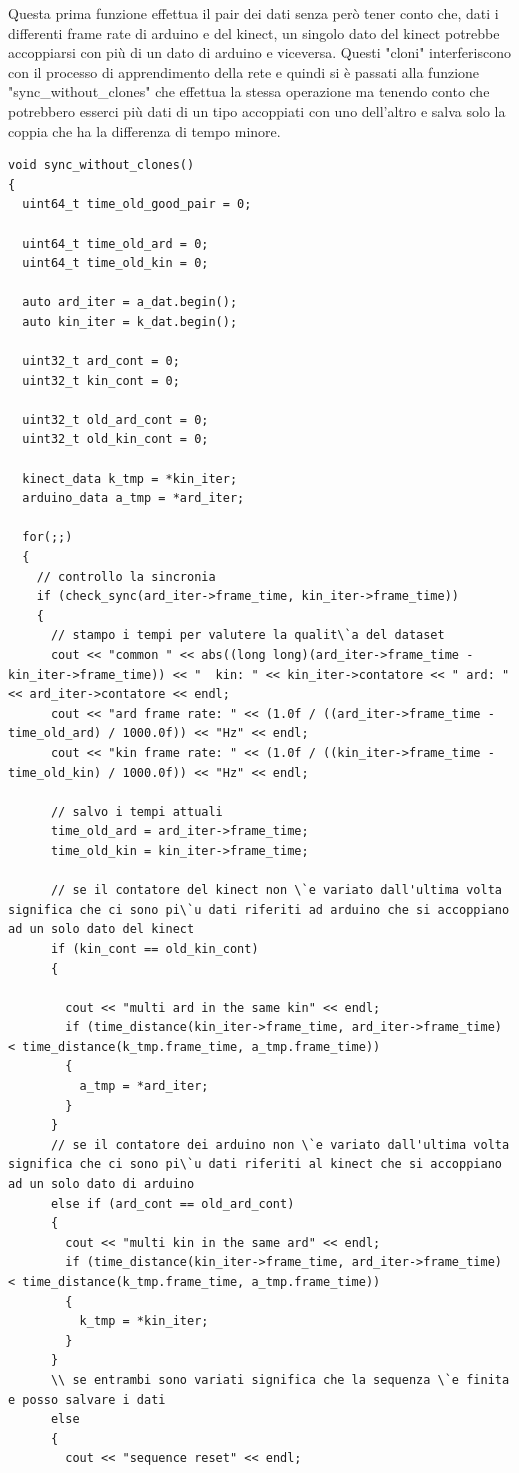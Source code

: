 \documentclass[10pt,a4paper]{article}
\begin{document}
Questa prima funzione effettua il pair dei dati senza per\`o tener conto che, dati i differenti frame rate di arduino e del kinect, un singolo dato del kinect potrebbe accoppiarsi con pi\`u di un dato di arduino e viceversa. Questi "cloni" interferiscono con il processo di apprendimento della rete e quindi si \`e passati alla funzione "sync\_without\_clones" che effettua la stessa operazione ma tenendo conto che potrebbero esserci pi\`u dati di un tipo accoppiati con uno dell'altro e salva solo la coppia che ha la differenza di tempo minore.
\begin{lstlisting}[style=mycpp, caption=funzione sync\_without\_clones, captionpos=b]
void sync_without_clones()
{
  uint64_t time_old_good_pair = 0;

  uint64_t time_old_ard = 0;
  uint64_t time_old_kin = 0;

  auto ard_iter = a_dat.begin();
  auto kin_iter = k_dat.begin();

  uint32_t ard_cont = 0;
  uint32_t kin_cont = 0;

  uint32_t old_ard_cont = 0;
  uint32_t old_kin_cont = 0;

  kinect_data k_tmp = *kin_iter;
  arduino_data a_tmp = *ard_iter;

  for(;;)
  {
    // controllo la sincronia
    if (check_sync(ard_iter->frame_time, kin_iter->frame_time))
    {
      // stampo i tempi per valutere la qualit\`a del dataset
      cout << "common " << abs((long long)(ard_iter->frame_time - kin_iter->frame_time)) << "  kin: " << kin_iter->contatore << " ard: " << ard_iter->contatore << endl;
      cout << "ard frame rate: " << (1.0f / ((ard_iter->frame_time - time_old_ard) / 1000.0f)) << "Hz" << endl;
      cout << "kin frame rate: " << (1.0f / ((kin_iter->frame_time - time_old_kin) / 1000.0f)) << "Hz" << endl;

      // salvo i tempi attuali
      time_old_ard = ard_iter->frame_time;
      time_old_kin = kin_iter->frame_time;

      // se il contatore del kinect non \`e variato dall'ultima volta significa che ci sono pi\`u dati riferiti ad arduino che si accoppiano ad un solo dato del kinect
      if (kin_cont == old_kin_cont)
      {
      
        cout << "multi ard in the same kin" << endl;
        if (time_distance(kin_iter->frame_time, ard_iter->frame_time) < time_distance(k_tmp.frame_time, a_tmp.frame_time))
        {
          a_tmp = *ard_iter;
        }
      }
      // se il contatore dei arduino non \`e variato dall'ultima volta significa che ci sono pi\`u dati riferiti al kinect che si accoppiano ad un solo dato di arduino
      else if (ard_cont == old_ard_cont)
      {
        cout << "multi kin in the same ard" << endl;
        if (time_distance(kin_iter->frame_time, ard_iter->frame_time) < time_distance(k_tmp.frame_time, a_tmp.frame_time))
        {
          k_tmp = *kin_iter;
        }
      }
      \\ se entrambi sono variati significa che la sequenza \`e finita e posso salvare i dati
      else
      {
        cout << "sequence reset" << endl;


\end{lstlisting}
\end{document}
